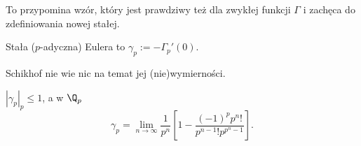 To przypomina wzór, który jest prawdziwy też dla zwykłej funkcji $\Gamma$ i zachęca do zdefiniowania nowej stałej.

\begin{definicja}
	Stała  ($p$-adyczna) Eulera to $\gamma_p := - \Gamma_p'(0)$.
\end{definicja}

Schikhof nie wie nic na temat jej (nie)wymierności.

\begin{fakt}
	$|\gamma_p|_p \le 1$, a w $\Q_p$
	\[
		\gamma_p = \lim_{n \to \infty} \frac 1 {p^n} \left[1 - \frac{(-1)^p p^n!}{p^{n-1}! p^{p^n-1}} \right].
	\]
\end{fakt}